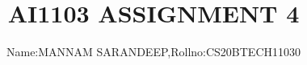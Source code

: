 \documentclass[journal,12pt,twocolumn]{IEEEtran}
\DeclareMathOperator*{\Res}{Res}
\begin{document}
\newcommand{\BEQA}{\begin{eqnarray}}
\newcommand{\EEQA}{\end{eqnarray}}
\newcommand{\define}{\stackrel{\triangle}{=}}

\raggedbottom
\setlength{\parindent}{0pt}
\providecommand{\mbf}{\mathbf}
\providecommand{\pr}[1]{\ensuremath{\Pr\left(#1\right)}}
\providecommand{\qfunc}[1]{\ensuremath{Q\left(#1\right)}}
\providecommand{\sbrak}[1]{\ensuremath{{}\left[#1\right]}}
\providecommand{\lsbrak}[1]{\ensuremath{{}\left[#1\right.}}
\providecommand{\rsbrak}[1]{\ensuremath{{}\left.#1\right]}}
\providecommand{\brak}[1]{\ensuremath{\left(#1\right)}}
\providecommand{\lbrak}[1]{\ensuremath{\left(#1\right.}}
\providecommand{\rbrak}[1]{\ensuremath{\left.#1\right)}}
\providecommand{\cbrak}[1]{\ensuremath{\left\{#1\right\}}}
\providecommand{\lcbrak}[1]{\ensuremath{\left\{#1\right.}}
\providecommand{\rcbrak}[1]{\ensuremath{\left.#1\right\}}}
\theoremstyle{remark}
\newtheorem{rem}{Remark}
\newcommand{\sgn}{\mathop{\mathrm{sgn}}}
\newcommand*{\permcomb}[4][0mu]{{{}^{#3}\mkern#1#2_{#4}}}
\newcommand*{\perm}[1][-3mu]{\permcomb[#1]{P}}
\newcommand*{\comb}[1][-1mu]{\permcomb[#1]{C}}
\providecommand{\abs}[1]{\vert#1\vert}
\providecommand{\res}[1]{\Res\displaylimits_{#1}} 
\providecommand{\norm}[1]{\lVert#1\rVert}
\providecommand{\mtx}[1]{\mathbf{#1}}
\providecommand{\mean}[1]{E[ #1 ]}
\providecommand{\fourier}{\overset{\mathcal{F}}{ \rightleftharpoons}}
\providecommand{\system}{\overset{\mathcal{H}}{ \longleftrightarrow}}
\newcommand{\solution}{\noindent \textbf{Solution: }}
\newcommand{\cosec}{\,\text{cosec}\,}
\providecommand{\dec}[2]{\ensuremath{\overset{#1}{\underset{#2}{\gtrless}}}}
\newcommand{\myvec}[1]{\ensuremath{\begin{pmatrix}#1\end{pmatrix}}}
\newcommand{\mydet}[1]{\ensuremath{\begin{vmatrix}#1\end{vmatrix}}}
\makeatletter
{}
\makeatother
\let\StandardTheFigure\thefigure
\let\vec\mathbf
\renewcommand{\thefigure}{\theproblem}
\def\putbox#1#2#3{\makebox[0in][l]{\makebox[#1][l]{}\raisebox{\baselineskip}[0in][0in]{\raisebox{#2}[0in][0in]{#3}}}}
     \def\rightbox#1{\makebox[0in][r]{#1}}
     \def\centbox#1{\makebox[0in]{#1}}
     \def\topbox#1{\raisebox{-\baselineskip}[0in][0in]{#1}}
     \def\midbox#1{\raisebox{-0.5\baselineskip}[0in][0in]{#1}}
\vspace{3cm}
\title{AI1103 ASSIGNMENT 4}
\author{Name:MANNAM SARANDEEP,Rollno:CS20BTECH11030}
\maketitle
\newpage
\bigskip
\renewcommand{\thefigure}{\theenumi}
\renewcommand{\thetable}{\theenumi}
\end{document}
